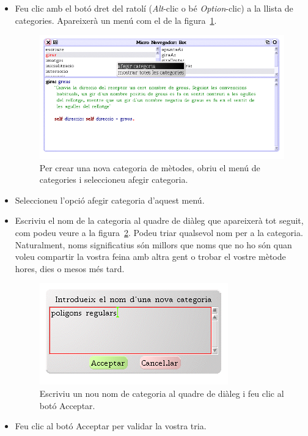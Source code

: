 \begin{itemize}
\item[\textbf{1.}] Feu clic amb el botó dret del ratolí (\emph{Alt}-clic o bé \emph{Option}-clic) a la llista de categories. Apareixerà un menú com el de la figura~\ref{fig1202}.
\begin{figure}[h]
\begin{center}
\includegraphics[scale=1.75]{Imatges/figura12-2.png}
\end{center}
\caption{Per crear una nova categoria de mètodes, obriu el menú de categories i seleccioneu \textsf{\upshape afegir categoria}.}
\label{fig1202}
\end{figure}
\item[\textbf{2.}] Seleccioneu l'opció \textsf{afegir categoria} d'aquest menú.
\item[\textbf{3.}] Escriviu el nom de la categoria al quadre de diàleg que apareixerà tot seguit, com podeu veure a la figura~\ref{fig1203}. Podeu triar qualsevol nom per a la categoria. Naturalment, noms significatius són millors que noms que no ho són quan voleu compartir la vostra feina amb altra gent o trobar el vostre mètode hores, dies o mesos més tard.
\begin{figure}[h]
\begin{center}
\includegraphics[scale=2.5]{Imatges/figura12-3.png}
\end{center}
\caption{Escriviu un nou nom de categoria al quadre de diàleg i feu clic al botó \textsf{\upshape Acceptar}.}
\label{fig1203}
\end{figure}
\item[\textbf{4.}] Feu clic al botó \textsf{Acceptar} per validar la vostra tria.
\end{itemize}


